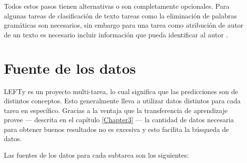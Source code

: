 Todos estos pasos tienen alternativas o son completamente opcionales. Para algunas tareas de clasificación de texto tareas como la eliminación de palabras gramáticas son necesarios, sin embargo para una tarea como atribución de autor de un texto es necesario incluir información que pueda identificar al autor \parencite{coulthard2004author, louwerse2004semantic}.

\section{Fuente de los datos}

LEFTy es un proyecto multi-tarea, lo cual significa que las predicciones son de distintos conceptos. Esto generalmente lleva a utilizar datos distintos para cada tarea en específico. Gracias a la ventaja que la transferencia de aprendizaje provee --- descrita en el capítulo \ref{Chapter3} --- la cantidad de datos necesaria para obtener buenos resultados no es excesiva y esto facilita la búsqueda de datos.

Las fuentes de los datos para cada subtarea son los siguientes:

